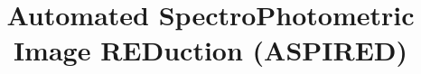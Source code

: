 \documentclass[linenumbers, twocolumn]{aastex631}
\begin{document}
\title{Automated SpectroPhotometric Image REDuction (\textsc{ASPIRED})}



\end{document}
